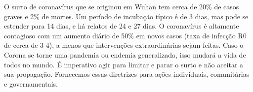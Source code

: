 \documentclass[onecolumn,journal]{IEEEtran}
\begin{document}

O surto de coronavírus que se originou em Wuhan tem cerca de 20\% de casos graves e 2\% de mortes. Um período de incubação típico é de 3 dias, mas pode se estender para 14 dias, e há relatos de 24 e 27 dias. O coronavírus é altamente contagioso com um aumento diário de 50\% em novos casos (taxa de infecção R0 de cerca de 3-4), a menos que intervenções extraordinárias sejam feitas. Caso o Corona se torne uma pandemia ou endemia generalizada, isso mudará a vida de todos no mundo. É imperativo agir para limitar e parar o surto e não aceitar a sua propagação. Fornecemos essas diretrizes para ações individuais, comunitárias e governamentais.
\end{document}
